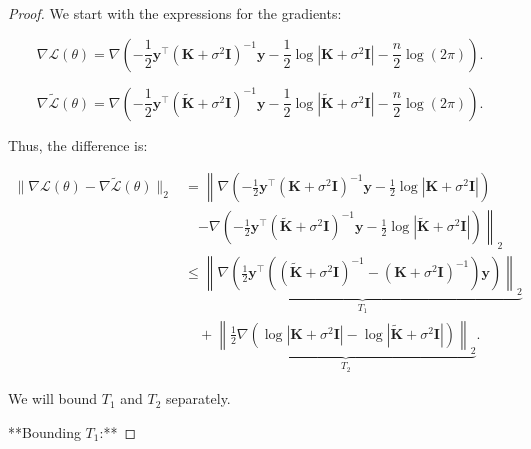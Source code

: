 \begin{proof}
We start with the expressions for the gradients:

$$
\nabla \mathcal{L}(\theta) = \nabla \left( -\frac{1}{2} \mathbf{y}^\top (\mathbf{K} + \sigma^2 \mathbf{I})^{-1} \mathbf{y} - \frac{1}{2} \log |\mathbf{K} + \sigma^2 \mathbf{I}| - \frac{n}{2} \log(2\pi) \right).
$$

$$
\nabla \tilde{\mathcal{L}}(\theta) = \nabla \left( -\frac{1}{2} \mathbf{y}^\top (\tilde{\mathbf{K}} + \sigma^2 \mathbf{I})^{-1} \mathbf{y} - \frac{1}{2} \log |\tilde{\mathbf{K}} + \sigma^2 \mathbf{I}| - \frac{n}{2} \log(2\pi) \right).
$$

Thus, the difference is:

\begin{align*}
\| \nabla \mathcal{L}(\theta) - \nabla \tilde{\mathcal{L}}(\theta) \|_2 &= \left\| \nabla \left( -\frac{1}{2} \mathbf{y}^\top (\mathbf{K} + \sigma^2 \mathbf{I})^{-1} \mathbf{y} - \frac{1}{2} \log |\mathbf{K} + \sigma^2 \mathbf{I}| \right) \right. \\
&\quad \left. - \nabla \left( -\frac{1}{2} \mathbf{y}^\top (\tilde{\mathbf{K}} + \sigma^2 \mathbf{I})^{-1} \mathbf{y} - \frac{1}{2} \log |\tilde{\mathbf{K}} + \sigma^2 \mathbf{I}| \right) \right\|_2 \\
&\leq \underbrace{\left\| \nabla \left( \frac{1}{2} \mathbf{y}^\top \left( (\tilde{\mathbf{K}} + \sigma^2 \mathbf{I})^{-1} - (\mathbf{K} + \sigma^2 \mathbf{I})^{-1} \right) \mathbf{y} \right) \right\|_2}_{T_1} \\
&\quad + \underbrace{\left\| \frac{1}{2} \nabla \left( \log |\mathbf{K} + \sigma^2 \mathbf{I}| - \log |\tilde{\mathbf{K}} + \sigma^2 \mathbf{I}| \right) \right\|_2}_{T_2}.
\end{align*}

We will bound $T_1$ and $T_2$ separately.

**Bounding $T_1$:**


\end{proof}
